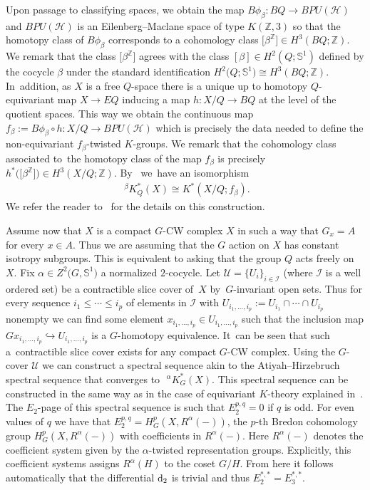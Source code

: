 \documentclass[10pt,a4paper]{amsart}
\def\Z{\mathbb{Z}}
\def\S{\mathbb{S}}
\newcommand{\cali}{\mathcal{I}}
\newcommand{\calu}{\mathcal{U}}
\newcommand{\calh}{\mathcal{H}}
\theoremstyle{definition}
\numberwithin{equation}{section}
\begin{document}
Upon passage to classifying spaces, we obtain the map $B\phi_{\beta}\colon BQ\to BPU(\calh)$
and $BPU(\calh)$ is an Eilenberg--Maclane space of type $K(\Z,3)$ so that the homotopy class of
$B\phi_{\beta}$ corresponds to a cohomology class $\big[\beta^\Z\big]\in H^{3}(BQ;\Z)$. We remark
that the class $\big[\beta^\Z\big]$ agrees with the class $[\beta]\in H^{2}(Q;\S^{1})$ defined by the
cocycle $\beta$ under the standard identification $H^{2}\big(Q;\S^{1}\big)\cong H^{3}(BQ;\Z)$. In~addition,
as $X$ is a free $Q$-space there is a unique up to homotopy $Q$-equivariant map $X \to EQ$ inducing
a map $h\colon X/Q \to BQ$ at the level of the quotient spaces. This way we obtain the continuous
map $f_{\beta}:=B\phi_\beta\circ h\colon X/Q\to BPU(\calh)$ which is precisely
the data needed to define the non-equivariant $f_{\beta}$-twisted $K$-groups. We remark
that the cohomology class associated to~the homotopy class of the map $f_{\beta}$ is precisely
$h^{*}\big(\big[\beta^\Z\big]\big)\in H^{3}(X/Q;\Z)$. By~\cite[equation~(3.6)]{GomezUribe} we~have an isomorphism
\begin{gather}\label{eqvsnoneq}
\phantom{i}^{\beta}K_{Q}^{\ast}(X)\cong K^{*}(X/Q;f_{\beta}).
\end{gather}
We refer the reader to~\cite[Section 3]{GomezUribe} for the details on this construction.

Assume now that $X$ is a compact $G$-CW complex $X$ in such a way that $G_{x}=A$ for every $x\in A$.
Thus we are assuming that the $G$ action on $X$ has constant isotropy subgroups.
This is equivalent to asking that the group $Q$ acts freely on $X$. Fix $\alpha\in Z^2\big(G,\S^{1}\big)$
a normalized $2$-cocycle. Let $\calu=\{U_{i}\}_{i\in \cali}$ (where $\cali$ is a well
ordered set) be a contractible slice cover of~$X$ by~$G$-invariant open sets.
Thus for every sequence $i_{1}\le \cdots\le i_{p}$ of elements in $\cali$ with
$U_{i_{1},\dots,i_{p}}:=U_{i_{1}}\cap\cdots\cap U_{i_{p}}$ nonempty
we can find some element $x_{i_{1},\dots,i_{p}}\in U_{i_{1},\dots, i_{p}}$
such that the inclusion map
$Gx_{i_{1},\dots,i_{p}}\hookrightarrow U_{i_{1},\dots,i_{p}}$ is a
$G$-homotopy equivalence. It~can be seen that such a~contractible slice cover exists
for any compact $G$-CW complex. Using the $G$-cover $\calu$ we can construct a spectral sequence
akin to the Atiyah--Hirzebruch spectral sequence that converges to $\phantom{i}^{\alpha}K_{G}^{\ast}(X)$.
This spectral sequence can be constructed in the same way as in the case of equivariant $K$-theory
explained in~\cite[Section 5]{Segal-Classifying}. The $E_{2}$-page of this
spectral sequence is such that $E_2^{p,q}=0$ if $q$ is odd. For even values of $q$ we have that
$E_2^{p,q}=H^p_G(X, R^{\alpha}(-))$, the $p$-th Bredon cohomology group $H^p_G(X, R^{\alpha}(-))$
with coefficients in $R^{\alpha}(-)$. Here $R^{\alpha}(-)$ denotes the coefficient system given by the
$\alpha$-twisted representation groups. Explicitly, this coefficient
systems assigns $R^{\alpha}(H)$ to the coset $G/H$. From here it follows automatically that the
differential ${\rm d}_{2}$ is trivial and thus $E^{*,*}_{2}=E^{*,*}_{3}$.
\end{document}
